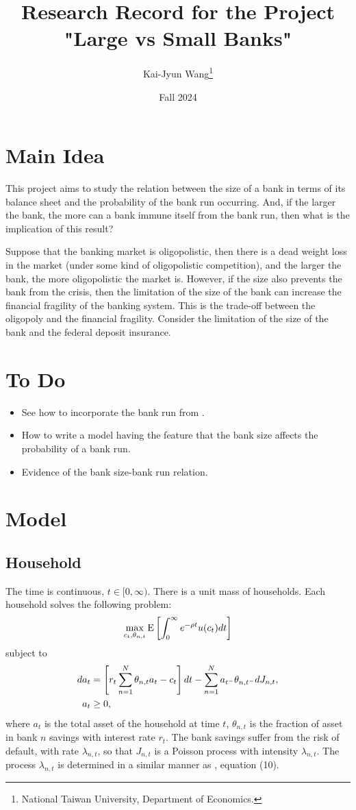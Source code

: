 \documentclass[a4paper, 12pt]{article}
\title{Research Record for the Project "Large vs Small Banks"}
\author{Kai-Jyun Wang\thanks{National Taiwan University, Department of Economics.}}
\date{Fall 2024}
\begin{document}
 
\maketitle

\section{Main Idea} 
This project aims to study the relation between the size of a 
bank in terms of its balance sheet and the probability of the 
bank run occurring. And, if the larger the bank, the more can 
a bank immune itself from the bank run, then what is the 
implication of this result? 

Suppose that the banking market is oligopolistic, then there 
is a dead weight loss in the market (under some kind of oligopolistic 
competition), and the larger the bank, the more oligopolistic the 
market is. However, if the size also prevents the bank from the 
crisis, then the limitation of the size of the bank can increase 
the financial fragility of the banking system. This is the 
trade-off between the oligopoly and the financial fragility. 
Consider the limitation of the size of the bank and the federal 
deposit insurance. 

\section{To Do}
\begin{itemize}
    \item See how to incorporate the bank run from \cite{diamond1983}.  
    \item How to write a model having the feature that the bank size affects 
    the probability of a bank run. 
    \item Evidence of the bank size-bank run relation.
\end{itemize}

\section{Model} 
\subsection{Household}
The time is continuous, $t\in[0,\infty)$. There is a unit mass of households. 
Each household solves the following problem:
\begin{equation}
    \max_{c_t, \theta_{n,t}} {\operatorname{E}}\left[ {\int_0^\infty e^{-\rho t}u(c_t)dt} \right]
\end{equation}
subject to
\begin{align}
    da_t &= \left[ {r_t\sum_{n=1}^N\theta_{n,t}a_t - c_t} \right]dt - \sum_{n=1}^N a_{t^-}\theta_{n,t^-}dJ_{n,t}, \\
    a_t &\geq 0, 
\end{align}
where $a_t$ is the total asset of the household at time $t$, 
$\theta_{n,t}$ is the fraction of asset in bank $n$ savings with interest 
rate $r_t$. The bank savings suffer from the risk of default, 
with rate $\lambda_{n,t}$, so that $J_{n,t}$ is a Poisson process with intensity 
$\lambda_{n,t}$. The process $\lambda_{n,t}$ is determined in a similar manner 
as \cite{moreira2017}, equation (10).
\end{document}
